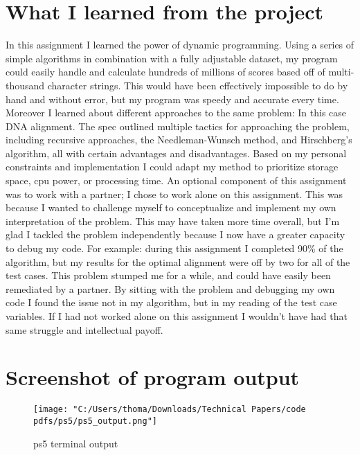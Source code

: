 \documentclass[12pt]{article}
\begin{document}
\section[3]{What I learned from the project}
\hfill\begin{minipage}{\dimexpr\textwidth-1cm}
In this assignment I learned the power of dynamic programming. Using a series of simple algorithms in combination with a fully adjustable dataset, my program could easily handle and calculate hundreds of millions of scores based off of multi-thousand character strings. This would have been effectively impossible to do by hand and without error, but my program was speedy and accurate every time. Moreover I learned about different approaches to the same problem: In this case DNA alignment. The spec outlined multiple tactics for approaching the problem, including recursive approaches, the Needleman-Wunsch method, and Hirschberg's algorithm, all with certain advantages and disadvantages. Based on my personal constraints and implementation I could adapt my method to prioritize storage space, cpu power, or processing time. \newline
\newline
An optional component of this assignment was to work with a partner; I chose to work alone on this assignment. This was because I wanted to challenge myself to conceptualize and implement my own interpretation of the problem. This may have taken more time overall, but I’m glad I tackled the problem independently because I now have a greater capacity to debug my code. For example: during this assignment I completed 90\% of the algorithm, but my results for the optimal alignment were off by two for all of the test cases. This problem stumped me for a while, and could have easily been remediated by a partner. By sitting with the problem and debugging my own code I found the issue not in my algorithm, but in my reading of the test case variables. If I had not worked alone on this assignment I wouldn’t have had that same struggle and intellectual payoff.
\end{minipage}

\section[4]{Screenshot of program output}
\begin{figure}[H]
  \centering
  \texttt{[image: "C:/Users/thoma/Downloads/Technical Papers/code pdfs/ps5/ps5\_output.png"]}
  \caption{ps5 terminal output}
  \label{fig:ps5_output}
\end{figure}
\end{document}
